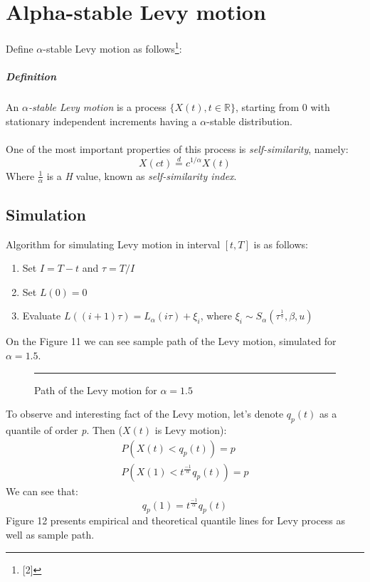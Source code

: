 \documentclass{article}
\newcommand\xput[2][0.5]{%
    \rule{#1\linewidth}{0pt}\makebox[0pt][c]{#2}\hfill}
\begin{document}
\clearpage
\section{Alpha-stable Levy motion}
Define $\alpha$-stable Levy motion as follows\footnote{[2]}:
\subparagraph{Definition}
An \textit{$\alpha$-stable Levy motion} is a process $\{X(t), t \in \mathbb{R}\}$, starting from 0 with stationary independent increments having a $\alpha$-stable distribution.\\
\\
One of the most important properties of this process is \textit{self-similarity}, namely:
\begin{equation}
X(ct) \stackrel{d}{=} c^{1/\alpha}X(t)
\end{equation}
Where $\frac{1}{\alpha}$ is a \textit{H} value, known as \textit{self-similarity index}.
\subsection{Simulation}
Algorithm for simulating Levy motion in interval $[t, T]$ is as follows:
\begin{enumerate}
\item Set $I = T - t$ and $\tau = T/I$
\item Set $L(0) = 0$
\item Evaluate $L((i + 1)\tau) = L_\alpha(i\tau) + \xi_i$, where $\xi_i \sim S_\alpha(\tau^{\frac{1}{\tau}}, \beta, u)$
\end{enumerate}
On the Figure 11 we can see sample path of the Levy motion, simulated for $\alpha = 1.5$.

	\begin{figure}[h]
		\xput[0.5]{\texttt{[image: levymotion\_sample]}}
		
		\caption{Path of the Levy motion for $\alpha = 1.5$}
	\end{figure}
\newpage
To observe and interesting fact of the Levy motion, let's denote $q_p(t)$ as a quantile of order \textit{p}. Then ($X(t)$ is Levy motion):
\begin{align*} 
P(X(t) < q_p(t)) = p  \\ 
P(X(1) < t^{\frac{-1}{\alpha}}q_p(t)) = p
\end{align*}
We can see that:
\begin{equation*}
q_p(1) = t^{\frac{-1}{\alpha}}q_p(t)
\end{equation*}
Figure 12 presents empirical and theoretical quantile lines for Levy process as well as sample path.
\end{document}
